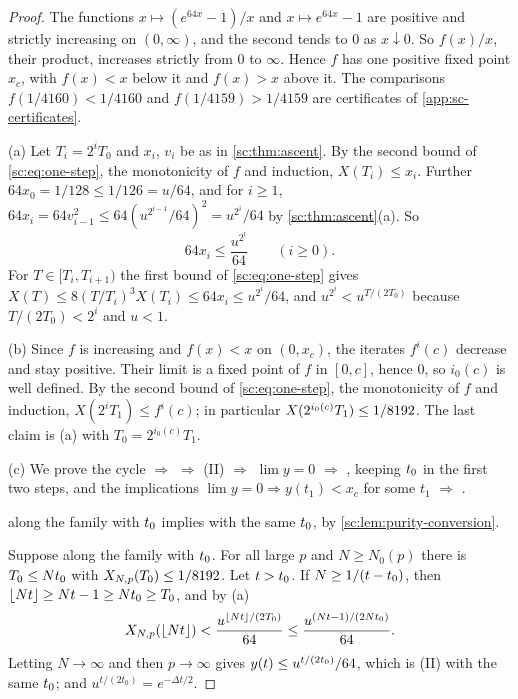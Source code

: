 \begin{proof}
The functions $x\mapsto(e^{64x}-1)/x$ and $x\mapsto e^{64x}-1$ are positive and strictly increasing on $(0,\infty)$, and the second tends to $0$ as $x\downarrow0$. So $f(x)/x$, their product, increases strictly from $0$ to $\infty$. Hence $f$ has one positive fixed point $x_c$, with $f(x)<x$ below it and $f(x)>x$ above it. The comparisons $f(1/4160)<1/4160$ and $f(1/4159)>1/4159$ are certificates of \cref{app:sc-certificates}.

(a) Let $T_i=2^iT_0$ and $x_i$, $v_i$ be as in \cref{sc:thm:ascent}. By the second bound of \eqref{sc:eq:one-step}, the monotonicity of $f$ and induction, $X(T_i)\le x_i$. Further $64x_0=1/128\le1/126=u/64$, and for $i\ge1$, $64x_i=64v_{i-1}^2\le64(u^{2^{i-1}}/64)^2=u^{2^i}/64$ by \cref{sc:thm:ascent}(a). So
\begin{equation}\label{sc:eq:envelope}
64x_i\le\frac{u^{2^i}}{64}\qquad(i\ge0).
\end{equation}
For $T\in[T_i,T_{i+1})$ the first bound of \eqref{sc:eq:one-step} gives $X(T)\le8(T/T_i)^3X(T_i)\le64x_i\le u^{2^i}/64$, and $u^{2^i}<u^{T/(2T_0)}$ because $T/(2T_0)<2^i$ and $u<1$.

(b) Since $f$ is increasing and $f(x)<x$ on $(0,x_c)$, the iterates $f^i(c)$ decrease and stay positive. Their limit is a fixed point of $f$ in $[0,c]$, hence $0$, so $i_0(c)$ is well defined. By the second bound of \eqref{sc:eq:one-step}, the monotonicity of $f$ and induction, $X(2^iT_1)\le f^i(c)$; in particular $X(2^{i_0(c)}T_1)\le1/8192$. The last claim is (a) with $T_0=2^{i_0(c)}T_1$.

(c) We prove the cycle \Mcirc{} $\Rightarrow$ \Bcirc{} $\Rightarrow$ (II) $\Rightarrow$ $\lim y=0$ $\Rightarrow$ \Mcirc{}, keeping $t_0$ in the first two steps, and the implications $\lim y=0\Rightarrow y(t_1)<x_c$ for some $t_1$ $\Rightarrow$ \Bcirc{}.

\Mcirc{} along the family with $t_0$ implies \Bcirc{} with the same $t_0$, by \cref{sc:lem:purity-conversion}.

Suppose \Bcirc{} along the family with $t_0$. For all large $p$ and $N\ge N_0(p)$ there is $T_0\le Nt_0$ with $X_{N,p}(T_0)\le1/8192$. Let $t>t_0$. If $N\ge1/(t-t_0)$, then $\lfloor Nt\rfloor\ge Nt-1\ge Nt_0\ge T_0$, and by (a)
\[
X_{N,p}(\lfloor Nt\rfloor)<\frac{u^{\lfloor Nt\rfloor/(2T_0)}}{64}\le\frac{u^{(Nt-1)/(2Nt_0)}}{64}.
\]
Letting $N\to\infty$ and then $p\to\infty$ gives $y(t)\le u^{t/(2t_0)}/64$, which is (II) with the same $t_0$; and $u^{t/(2t_0)}=e^{-\Delta t/2}$.


\end{proof}
